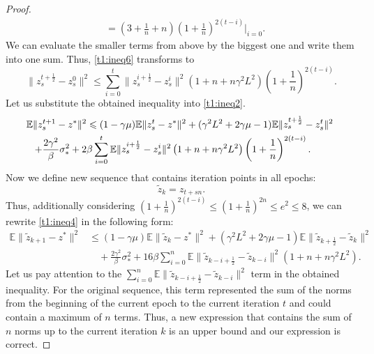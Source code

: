 \documentclass{article}
\begin{document}
\begin{proof}
\begin{align*}
            &= \left(3 + \frac{1}{n} + n\right)\left(1 + \frac{1}{n}\right)^{2(t-i)}\bigg|_{i = 0}.
        \end{align*}
        We can evaluate the smaller terms from above by the biggest one and write them into one sum. Thus, \eqref{t1:ineq6} transforms to
        \begin{equation*}
            \|z_s^{t+\frac{1}{2}} - z_s^0\|^2 \leqslant\sum\limits_{i = 0}^t \|z_s^{i + \frac{1}{2}} - z_s^i\|^2\left(1 + n + n\gamma^2 L^2\right)\left(1 + \frac{1}{n}\right)^{2(t-i)}.
        \end{equation*}
      Let us substitute the obtained inequality into \eqref{t1:ineq2}.
        \begin{align}
            \notag
            \mathbb{E} \|z_s^{t+1} - z^*\|^2 & \leqslant (1 - \gamma\mu)\mathbb{E} \|z_s^t - z^*\|^2 + (\gamma^2 L^2 + 2\gamma\mu - 1)\mathbb{E} \|z_s^{t+\frac{1}{2}} - z_s^t\|^2 ~ \\
            \label{t1:ineq4}
            + \frac{2\gamma^2}{\beta}\sigma_*^2 + 2&\beta \sum\limits_{i = 0}^t \mathbb{E} \|z_s^{i + \frac{1}{2}} - z_s^i\|^2\left(1 + n + n\gamma^2 L^2\right)\left(1 + \frac{1}{n}\right)^{2(t-i)}.
        \end{align}
        Now we define new sequence that contains iteration points in all epochs:
        \begin{equation*}
            \widetilde{z}_k = z_{t+sn}.
        \end{equation*}
        Thus, additionally considering $\left(1+\frac{1}{n}\right)^{2(t-i)} \leqslant \left(1+\frac{1}{n}\right)^{2n} \leqslant e^2 \leqslant 8$, we can rewrite \eqref{t1:ineq4} in the following form:
        \begin{align*}
            \mathbb{E} \|\widetilde{z}_{k+1} - z^*\|^2 & \leqslant (1 - \gamma\mu)\mathbb{E} \|\widetilde{z}_k - z^*\|^2 + (\gamma^2 L^2 + 2\gamma\mu - 1)\mathbb{E} \|\widetilde{z}_{k+\frac{1}{2}} - \widetilde{z}_k\|^2 ~ \\
            &\quad + \frac{2\gamma^2}{\beta}\sigma_*^2 + 16\beta \sum\limits_{i = 0}^n \mathbb{E} \|\widetilde{z}_{k - i + \frac{1}{2}} - \widetilde{z}_{k-i}\|^2\left(1 + n + n\gamma^2 L^2\right).
        \end{align*}
        Let us pay attention to the $\sum\limits_{i = 0}^n \mathbb{E} \|\widetilde{z}_{k - i + \frac{1}{2}} - \widetilde{z}_{k-i}\|^2$ term in the obtained inequality. For the original sequence, this term represented the sum of the norms from the beginning of the current epoch to the current iteration $t$ and could contain a maximum of $n$ terms. Thus, a new expression that contains the sum of $n$ norms up to the current iteration $k$ is an upper bound and our expression is correct.

\end{proof}
\end{document}
